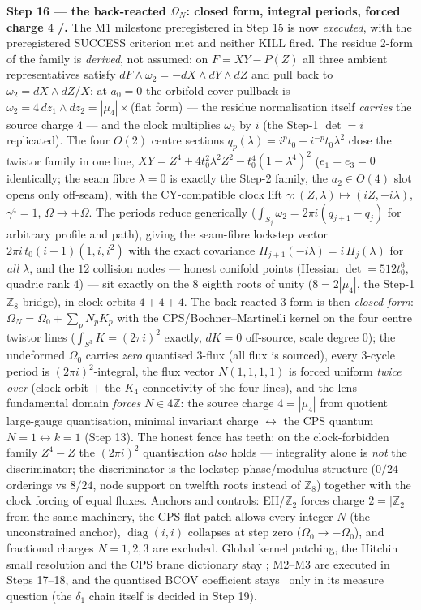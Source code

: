 \documentclass[11pt,a4paper]{article}
\newcommand{\Z}{\mathbb{Z}}
\theoremstyle{definition}
\begin{document}
\par\smallskip\noindent\textbf{Step 16 --- the back-reacted $\Omega_N$: closed form, integral
periods, forced charge $4$ \mE/\mC.} The M1 milestone preregistered in Step 15 is now
\emph{executed}, with the preregistered SUCCESS criterion met and neither KILL fired. The residue
$2$-form of the family is \emph{derived}, not assumed: on $F=XY-P(Z)$ all three ambient
representatives satisfy $dF\wedge\omega_2=-dX{\wedge}dY{\wedge}dZ$ and pull back to
$\omega_2=dX{\wedge}dZ/X$; at $a_0=0$ the orbifold-cover pullback is
$\omega_2=4\,dz_1{\wedge}dz_2=|\mu_4|\times$(flat form) --- the residue normalisation itself
\emph{carries} the source charge $4$ --- and the clock multiplies $\omega_2$ by $i$ (the Step-1
$\det=i$ replicated). The four $O(2)$ centre sections $q_p(\lambda)=i^pt_0-i^{-p}t_0\lambda^2$
close the twistor family in one line, $XY=Z^4+4t_0^2\lambda^2Z^2-t_0^4(1-\lambda^4)^2$
($e_1=e_3=0$ identically; the seam fibre $\lambda=0$ is exactly the Step-2 family, the
$a_2\in O(4)$ slot opens only off-seam), with the CY-compatible clock lift
$\gamma:(Z,\lambda)\mapsto(iZ,-i\lambda)$, $\gamma^4=1$, $\Omega\to+\Omega$. The periods reduce
generically ($\int_{S_j}\omega_2=2\pi i(q_{j+1}-q_j)$ for arbitrary profile and path), giving the
seam-fibre lockstep vector $2\pi i\,t_0(i-1)(1,i,i^2)$ with the exact covariance
$\Pi_{j+1}(-i\lambda)=i\,\Pi_j(\lambda)$ for \emph{all} $\lambda$, and the $12$ collision nodes
--- honest conifold points (Hessian $\det=512t_0^6$, quadric rank $4$) --- sit exactly on the
$8$ eighth roots of unity ($8=2|\mu_4|$, the Step-1 $\Z_8$ bridge), in clock orbits $4{+}4{+}4$.
The back-reacted $3$-form is then \emph{closed form}: $\Omega_N=\Omega_0+\sum_pN_pK_p$ with the
CPS/Bochner--Martinelli kernel on the four centre twistor lines ($\int_{S^3}K=(2\pi i)^2$
exactly, $dK=0$ off-source, scale degree $0$); the undeformed $\Omega_0$ carries \emph{zero}
quantised $3$-flux (all flux is sourced), every $3$-cycle period is $(2\pi i)^2$-integral, the
flux vector $N(1,1,1,1)$ is forced uniform \emph{twice over} (clock orbit $+$ the $K_4$
connectivity of the four lines), and the lens fundamental domain \emph{forces} $N\in4\Z$: the
source charge $4=|\mu_4|$ from quotient large-gauge quantisation, minimal invariant charge
$\leftrightarrow$ the CPS quantum $N=1\leftrightarrow k=1$ (Step 13). The honest fence has
teeth: on the clock-forbidden family $Z^4-Z$ the $(2\pi i)^2$ quantisation \emph{also} holds ---
integrality alone is \emph{not} the discriminator; the discriminator is the lockstep
phase/modulus structure ($0/24$ orderings vs $8/24$, node support on twelfth roots instead of
$\Z_8$) together with the clock forcing of equal fluxes. Anchors and controls: EH/$\Z_2$ forces
charge $2=|\Z_2|$ from the same machinery, the CPS flat patch allows every integer $N$ (the
unconstrained anchor), $\operatorname{diag}(i,i)$ collapses at step zero
($\Omega_0\to-\Omega_0$), and fractional charges $N=1,2,3$ are excluded. Global kernel
patching, the Hitchin small resolution and the CPS brane dictionary stay \mC; M2--M3 are
executed in Steps 17--18, and the quantised BCOV coefficient stays \mO\ only in its measure
question (the $\delta_1$ chain itself is decided in Step 19).
\end{document}

